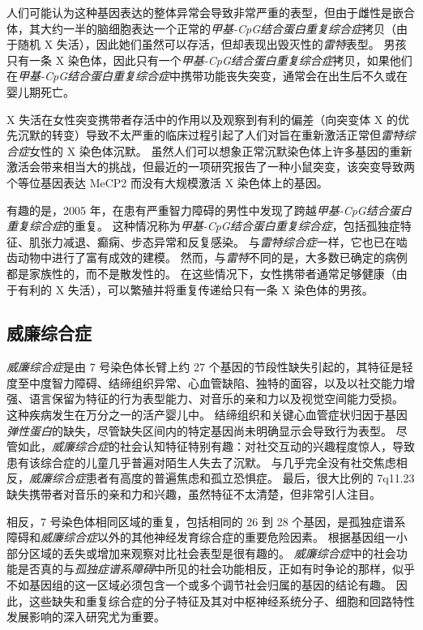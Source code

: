 人们可能认为这种基因表达的整体异常会导致非常严重的表型，但由于雌性是嵌合体，其大约一半的脑细胞表达一个正常的\textit{甲基-CpG结合蛋白重复综合症}拷贝（由于随机 X 失活），因此她们虽然可以存活，但却表现出毁灭性的\textit{雷特}表型。
男孩只有一条 X 染色体，因此只有一个\textit{甲基-CpG结合蛋白重复综合症}拷贝，如果他们在\textit{甲基-CpG结合蛋白重复综合症}中携带功能丧失突变，通常会在出生后不久或在婴儿期死亡。


X 失活在女性突变携带者存活中的作用以及观察到有利的偏差（向突变体 X 的优先沉默的转变）导致不太严重的临床过程引起了人们对旨在重新激活正常但\textit{雷特综合症}女性的 X 染色体沉默。
虽然人们可以想象正常沉默染色体上许多基因的重新激活会带来相当大的挑战，但最近的一项研究报告了一种小鼠突变，该突变导致两个等位基因表达 MeCP2 而没有大规模激活 X 染色体上的基因。


有趣的是，2005 年，在患有严重智力障碍的男性中发现了跨越\textit{甲基-CpG结合蛋白重复综合症}的重复。
这种情况称为\textit{甲基-CpG结合蛋白重复综合症}，包括孤独症特征、肌张力减退、癫痫、步态异常和反复感染。
与\textit{雷特综合症}一样，它也已在啮齿动物中进行了富有成效的建模。
然而，与\textit{雷特}不同的是，大多数已确定的病例都是家族性的，而不是散发性的。
在这些情况下，女性携带者通常足够健康（由于有利的 X 失活），可以繁殖并将重复传递给只有一条 X 染色体的男孩。



\subsection{威廉综合症}

\textit{威廉综合症}是由 7 号染色体长臂上约 27 个基因的节段性缺失引起的，其特征是轻度至中度智力障碍、结缔组织异常、心血管缺陷、独特的面容，以及以社交能力增强、语言保留为特征的行为表型能力、对音乐的亲和力以及视觉空间能力受损。
这种疾病发生在万分之一的活产婴儿中。
结缔组织和关键心血管症状归因于基因\textit{弹性蛋白}的缺失，尽管缺失区间内的特定基因尚未明确显示会导致行为表型。
尽管如此，\textit{威廉综合症}的社会认知特征特别有趣：对社交互动的兴趣程度惊人，导致患有该综合症的儿童几乎普遍对陌生人失去了沉默。
与几乎完全没有社交焦虑相反，\textit{威廉综合症}患者有高度的普遍焦虑和孤立恐惧症。
最后，很大比例的 7q11.23 缺失携带者对音乐的亲和力和兴趣，虽然特征不太清楚，但非常引人注目。


相反，7 号染色体相同区域的重复，包括相同的 26 到 28 个基因，是孤独症谱系障碍和\textit{威廉综合症}以外的其他神经发育综合症的重要危险因素。
根据基因组一小部分区域的丢失或增加来观察对比社会表型是很有趣的。
\textit{威廉综合症}中的社会功能是否真的与\textit{孤独症谱系障碍}中所见的社会功能相反，正如有时争论的那样，似乎不如基因组的这一区域必须包含一个或多个调节社会归属的基因的结论有趣。
因此，这些缺失和重复综合症的分子特征及其对中枢神经系统分子、细胞和回路特性发展影响的深入研究尤为重要。



